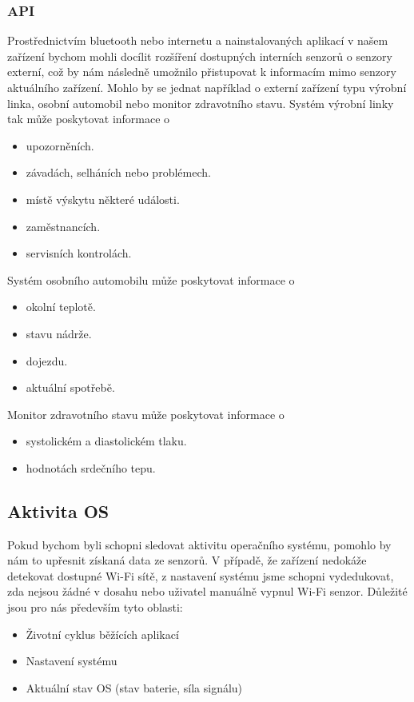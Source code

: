 \documentclass[thesis=M,czech]{FITthesis}[2012/06/26]
\begin{document}
\subsubsection*{API}
Prostřednictvím bluetooth nebo internetu a nainstalovaných aplikací v našem zařízení bychom mohli docílit rozšíření dostupných interních senzorů o senzory externí, což by nám následně umožnilo přistupovat k informacím mimo  senzory aktuálního zařízení. Mohlo by se jednat například o externí zařízení typu výrobní linka, osobní automobil nebo monitor zdravotního stavu. Systém výrobní linky tak může poskytovat informace o

\begin{itemize}
\item    upozorněních.
\item    závadách, selháních nebo problémech.
\item    místě výskytu některé události.
\item    zaměstnancích.
\item    servisních kontrolách.
\end{itemize}
Systém osobního automobilu může poskytovat informace o
\begin{itemize}
\item    okolní teplotě.
\item    stavu nádrže.
\item    dojezdu.
\item    aktuální spotřebě.
\end{itemize}
Monitor zdravotního stavu může poskytovat informace o
\begin{itemize}
\item    systolickém a diastolickém tlaku.
\item    hodnotách srdečního tepu.
\end{itemize}

\subsection{Aktivita OS}
Pokud bychom byli schopni sledovat aktivitu operačního systému, pomohlo by nám to upřesnit získaná data ze senzorů. V případě, že zařízení nedokáže detekovat dostupné Wi-Fi sítě, z nastavení systému jsme schopni vydedukovat, zda nejsou žádné v dosahu nebo uživatel manuálně vypnul Wi-Fi senzor. Důležité jsou pro nás především tyto oblasti:

\begin{itemize}
\item    Životní cyklus běžících aplikací
\item    Nastavení systému
\item    Aktuální stav OS (stav baterie, síla signálu)
\end{itemize}
\end{document}
